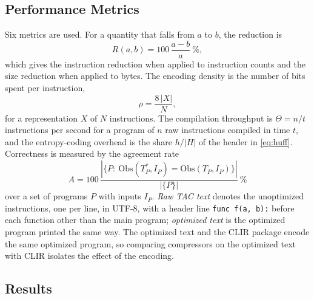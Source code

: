 \documentclass{ieeeaccess}
\newcommand{\clir}{CLIR}
\begin{document}
\subsection{Performance Metrics}
Six metrics are used. For a quantity that falls from $a$ to $b$, the reduction is
\begin{equation}
R(a,b) = 100\,\frac{a-b}{a}\ \%,
\label{eq:red}
\end{equation}
which gives the instruction reduction when applied to instruction counts and the size reduction when applied to bytes. The encoding density is the number of bits spent per instruction,
\begin{equation}
\rho=\frac{8\,|X|}{N},
\label{eq:density}
\end{equation}
for a representation $X$ of $N$ instructions. The compilation throughput is $\Theta=n/t$ instructions per second for a program of $n$ raw instructions compiled in time $t$, and the entropy-coding overhead is the share $h/|H|$ of the header in \eqref{eq:huff}. Correctness is measured by the agreement rate
\begin{equation}
A=100\,\frac{|\{P:\ \mathrm{Obs}(T_P^\ast,I_P)=\mathrm{Obs}(T_P,I_P)\}|}{|\{P\}|}\ \%
\label{eq:agree}
\end{equation}
over a set of programs $P$ with inputs $I_P$. \emph{Raw TAC text} denotes the unoptimized instructions, one per line, in UTF-8, with a header line \texttt{func f(a, b):} before each function other than the main program; \emph{optimized text} is the optimized program printed the same way. The optimized text and the \clir{} package encode the same optimized program, so comparing compressors on the optimized text with \clir{} isolates the effect of the encoding.

\subsection{Results}
\end{document}
